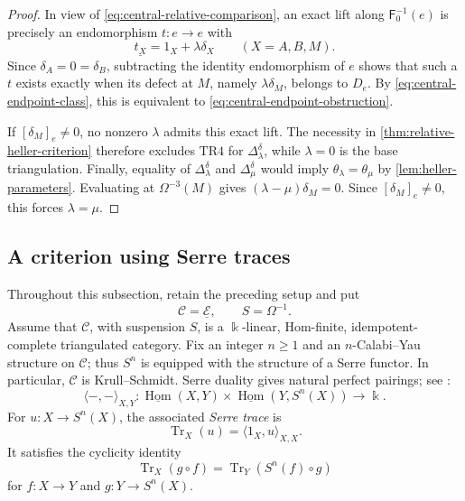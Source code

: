 \documentclass[a4paper,11pt,reqno]{amsart}
\theoremstyle{definition}
\theoremstyle{plain}
\numberwithin{equation}{section}
\newcommand{\C}{\mathcal C}
\newcommand{\Hom}{\operatorname{Hom}}
\newcommand{\kk}{\Bbbk}
\begin{document}
\begin{proof}
In view of \eqref{eq:central-relative-comparison}, an exact lift along
\(\mathsf F_0^{-1}(e)\) is precisely an endomorphism \(t:e\to e\) with
\[
 \underline{t_X}=1_X+\lambda\delta_X
 \qquad(X=A,B,M).
\]
Since \(\delta_A=0=\delta_B\), subtracting the identity endomorphism of
\(e\) shows that such a \(t\) exists exactly when its defect at \(M\),
namely \(\lambda\delta_M\), belongs to \(D_e\).  By
\eqref{eq:central-endpoint-class}, this is equivalent to
\eqref{eq:central-endpoint-obstruction}.

If \([\delta_M]_e\ne0\), no nonzero \(\lambda\) admits this exact lift.
The necessity in \cref{thm:relative-heller-criterion} therefore excludes
\(\mathrm{TR4}\) for \(\Delta_\lambda^\delta\), while \(\lambda=0\) is the
base triangulation.  Finally, equality of
\(\Delta_\lambda^\delta\) and \(\Delta_\mu^\delta\) would imply
\(\theta_\lambda=\theta_\mu\) by
\cref{lem:heller-parameters}.  Evaluating at
\(\Omega^{-3}(M)\) gives
\((\lambda-\mu)\delta_M=0\).  Since
\([\delta_M]_e\ne0\), this forces \(\lambda=\mu\).
\end{proof}

\subsection{A criterion using Serre traces}

Throughout this subsection, retain the preceding setup and put
\[
 \C=\underline{\mathcal E},
 \qquad
 S=\Omega^{-1}.
\]
Assume that \(\C\), with suspension \(S\), is a \(\kk\)-linear,
Hom-finite, idempotent-complete triangulated category.  Fix an integer
\(n\ge1\) and an
\(n\)-Calabi--Yau structure on \(\C\); thus \(S^n\) is equipped with the
structure of a Serre functor.  In particular, \(\C\) is Krull--Schmidt.
Serre duality gives natural perfect pairings; see
\cite[Section~I.1, especially equations~(I.1.1)--(I.1.4)]
{ReitenVanDenBergh2002}:
\[
 \langle-,-\rangle_{X,Y}:
 \underline{\Hom}(X,Y)\times
 \underline{\Hom}(Y,S^n(X))\longrightarrow\kk.
\]
For \(u:X\to S^n(X)\), the associated \emph{Serre trace} is
\[
 \operatorname{Tr}_X(u)=\langle1_X,u\rangle_{X,X}.
\]
It satisfies the cyclicity identity
\begin{equation}
\label{eq:serre-trace-cyclicity}
 \operatorname{Tr}_X(g\circ f)
 =\operatorname{Tr}_Y(S^n(f)\circ g)
\end{equation}
for \(f:X\to Y\) and \(g:Y\to S^n(X)\).
\end{document}
